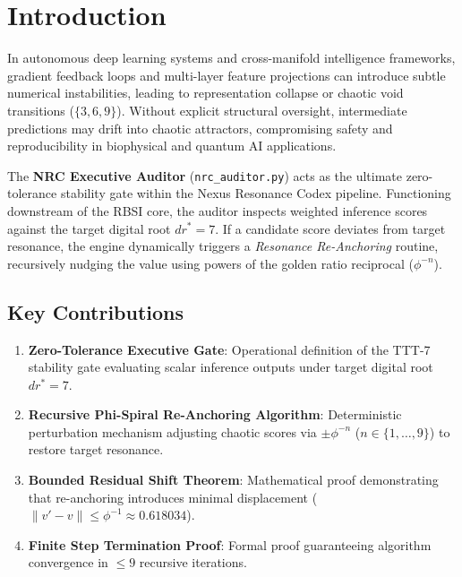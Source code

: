 \section{Introduction}
In autonomous deep learning systems and cross-manifold intelligence frameworks, gradient feedback loops and multi-layer feature projections can introduce subtle numerical instabilities, leading to representation collapse or chaotic void transitions ($\{3, 6, 9\}$). Without explicit structural oversight, intermediate predictions may drift into chaotic attractors, compromising safety and reproducibility in biophysical and quantum AI applications.

The \textbf{NRC Executive Auditor} (\texttt{nrc\_auditor.py}) acts as the ultimate zero-tolerance stability gate within the Nexus Resonance Codex pipeline. Functioning downstream of the RBSI core, the auditor inspects weighted inference scores against the target digital root $dr^* = 7$. If a candidate score deviates from target resonance, the engine dynamically triggers a \textit{Resonance Re-Anchoring} routine, recursively nudging the value using powers of the golden ratio reciprocal ($\phi^{-n}$).

\subsection{Key Contributions}
\begin{enumerate}[label=\textbf{\arabic*.}]
    \item \textbf{Zero-Tolerance Executive Gate}: Operational definition of the TTT-7 stability gate evaluating scalar inference outputs under target digital root $dr^* = 7$.
    \item \textbf{Recursive Phi-Spiral Re-Anchoring Algorithm}: Deterministic perturbation mechanism adjusting chaotic scores via $\pm \phi^{-n}$ ($n \in \{1, \dots, 9\}$) to restore target resonance.
    \item \textbf{Bounded Residual Shift Theorem}: Mathematical proof demonstrating that re-anchoring introduces minimal displacement ($\|v' - v\| \le \phi^{-1} \approx 0.618034$).
    \item \textbf{Finite Step Termination Proof}: Formal proof guaranteeing algorithm convergence in $\le 9$ recursive iterations.
\end{enumerate}
